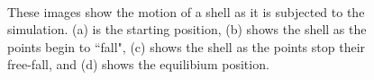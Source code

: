 \documentclass{thesis}
\begin{document}
\begin{figure}
\centering
{}
\\
\caption[Simulation frames]{These images show the motion of a shell as it is subjected to the simulation.  (a) is the starting position,
(b) shows the shell as the points begin to ``fall", (c) shows the shell as the points stop their free-fall, and (d) shows the equilibium
position.}
\label{fig:wireframe_sim}
\end{figure}
\end{document}
